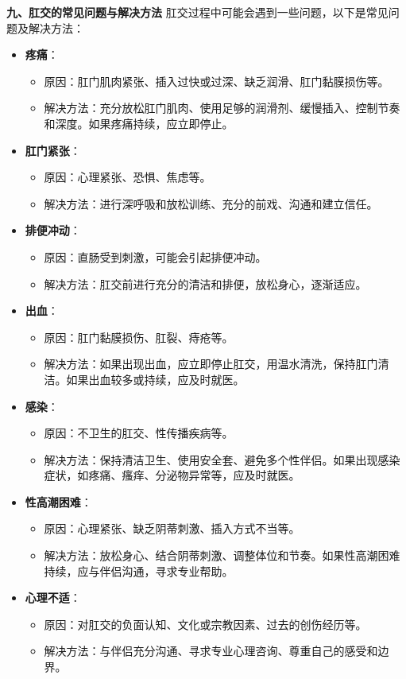 \documentclass[12pt,UTF8]{ctexbook}
\begin{document}
\textbf{九、肛交的常见问题与解决方法}
肛交过程中可能会遇到一些问题，以下是常见问题及解决方法：

\begin{itemize}
	\item \textbf{疼痛}：
	\begin{itemize}
		\item 原因：肛门肌肉紧张、插入过快或过深、缺乏润滑、肛门黏膜损伤等。
		\item 解决方法：充分放松肛门肌肉、使用足够的润滑剂、缓慢插入、控制节奏和深度。如果疼痛持续，应立即停止。
	\end{itemize}
	\item \textbf{肛门紧张}：
	\begin{itemize}
		\item 原因：心理紧张、恐惧、焦虑等。
		\item 解决方法：进行深呼吸和放松训练、充分的前戏、沟通和建立信任。
	\end{itemize}
	\item \textbf{排便冲动}：
	\begin{itemize}
		\item 原因：直肠受到刺激，可能会引起排便冲动。
		\item 解决方法：肛交前进行充分的清洁和排便，放松身心，逐渐适应。
	\end{itemize}
	\item \textbf{出血}：
	\begin{itemize}
		\item 原因：肛门黏膜损伤、肛裂、痔疮等。
		\item 解决方法：如果出现出血，应立即停止肛交，用温水清洗，保持肛门清洁。如果出血较多或持续，应及时就医。
	\end{itemize}
	\item \textbf{感染}：
	\begin{itemize}
		\item 原因：不卫生的肛交、性传播疾病等。
		\item 解决方法：保持清洁卫生、使用安全套、避免多个性伴侣。如果出现感染症状，如疼痛、瘙痒、分泌物异常等，应及时就医。
	\end{itemize}
	\item \textbf{性高潮困难}：
	\begin{itemize}
		\item 原因：心理紧张、缺乏阴蒂刺激、插入方式不当等。
		\item 解决方法：放松身心、结合阴蒂刺激、调整体位和节奏。如果性高潮困难持续，应与伴侣沟通，寻求专业帮助。
	\end{itemize}
	\item \textbf{心理不适}：
	\begin{itemize}
		\item 原因：对肛交的负面认知、文化或宗教因素、过去的创伤经历等。
		\item 解决方法：与伴侣充分沟通、寻求专业心理咨询、尊重自己的感受和边界。
	\end{itemize}
\end{itemize}
\end{document}
